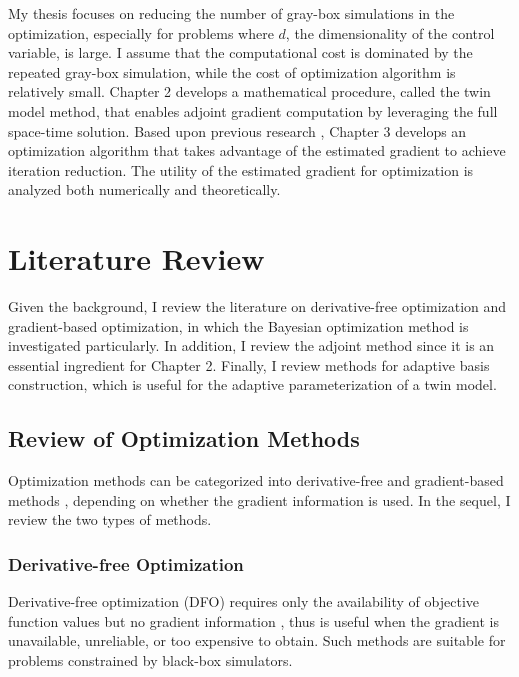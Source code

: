 My thesis focuses on reducing the number of gray-box simulations in the optimization,
especially for problems where $d$, the dimensionality of the control variable,
is large. I assume that the computational cost
is dominated by the repeated gray-box simulation, while the cost of optimization algorithm 
is relatively small. Chapter 2 develops a mathematical procedure, called the twin model method, 
that enables adjoint gradient computation by leveraging the full space-time solution.
Based upon previous research \cite{derivative RKHS, convergen EI, practical Bayesian, review EI, grad coKriging, KennedyOhagan1, KennedyOhagan2}, 
Chapter 3 develops an optimization algorithm that takes 
advantage of the estimated gradient to achieve iteration reduction. The utility of
the estimated gradient for optimization is analyzed both numerically and theoretically.

\section{Literature Review}
\label{section: literature}

Given the background, I review the literature on derivative-free optimization and gradient-based optimization, in which 
the Bayesian optimization method is investigated particularly.
In addition, I review the adjoint method since it is an essential ingredient for Chapter 2. Finally, I review methods for adaptive basis construction,
which is useful for the adaptive parameterization of a twin model.

\subsection{Review of Optimization Methods}
\label{sec: review optimization}
Optimization methods can be categorized into derivative-free and gradient-based methods 
\cite{gradfreereview}, depending on whether the gradient information is used. 
In the sequel, I review the two types of methods.\\
\subsubsection{Derivative-free Optimization}
\label{section: DFO}
Derivative-free optimization (DFO) requires only the availability of objective
function values but no gradient information \cite{gradfreereview}, thus is useful when the gradient
is unavailable, unreliable, or too expensive to obtain. 
Such methods are suitable for problems constrained by black-box simulators.\\


